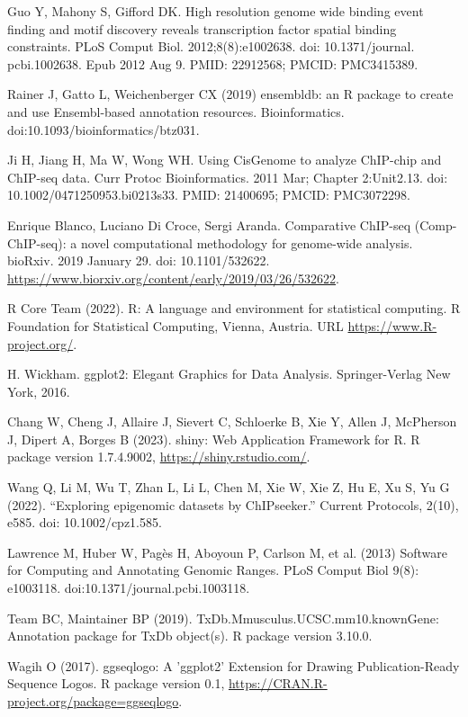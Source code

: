 \documentclass[12pt]{article}
\begin{document}
\begin{thebibliography}{99}
 Guo Y, Mahony S, Gifford DK. High resolution genome wide
binding event finding and motif discovery reveals transcription factor spatial
binding constraints. PLoS Comput Biol. 2012;8(8):e1002638. doi: 10.1371/journal.
pcbi.1002638. Epub 2012 Aug 9. PMID: 22912568; PMCID: PMC3415389.

 Rainer J, Gatto L, Weichenberger CX (2019) ensembldb: an R
package to create and use Ensembl-based annotation resources. Bioinformatics.
doi:10.1093/bioinformatics/btz031.

 Ji H, Jiang H, Ma W, Wong WH. Using CisGenome to analyze
ChIP-chip and ChIP-seq data. Curr Protoc Bioinformatics. 2011 Mar;
Chapter 2:Unit2.13. doi: 10.1002/0471250953.bi0213s33. PMID: 21400695;
PMCID: PMC3072298.

 Enrique Blanco, Luciano Di Croce, Sergi Aranda. Comparative
ChIP-seq (Comp-ChIP-seq): a novel computational methodology for genome-wide
analysis. bioRxiv. 2019 January 29. doi: 10.1101/532622. \newline
\url{https://www.biorxiv.org/content/early/2019/03/26/532622}.

 R Core Team (2022). R: A language and environment for statistical
computing. R Foundation for Statistical Computing, Vienna, Austria. URL
\url{https://www.R-project.org/}.

 H. Wickham. ggplot2: Elegant Graphics for Data Analysis.
Springer-Verlag New York, 2016.

 Chang W, Cheng J, Allaire J, Sievert C, Schloerke B, Xie Y,
Allen J, McPherson J, Dipert A, Borges B (2023). shiny: Web Application
Framework for R. R package version 1.7.4.9002, \url{https://shiny.rstudio.com/}.

 Wang Q, Li M, Wu T, Zhan L, Li L, Chen M, Xie W, Xie Z,
Hu E, Xu S, Yu G (2022). “Exploring epigenomic datasets by ChIPseeker.”
Current Protocols, 2(10), e585. doi: 10.1002/cpz1.585.

 Lawrence M, Huber W, Pag\`es H, Aboyoun P, Carlson M,
et al. (2013) Software for Computing and Annotating Genomic Ranges. PLoS Comput
Biol 9(8): e1003118. doi:10.1371/journal.pcbi.1003118.

 Team BC, Maintainer BP (2019). 
TxDb.Mmusculus.UCSC.mm10.knownGene: Annotation package for TxDb object(s).
R package version 3.10.0.

 Wagih O (2017). ggseqlogo: A 'ggplot2' Extension for
Drawing Publication-Ready Sequence Logos. R package version 0.1, \newline
\url{https://CRAN.R-project.org/package=ggseqlogo}.


\end{thebibliography}
\end{document}
